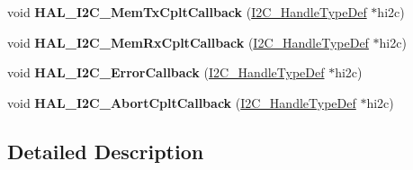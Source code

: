 \begin{DoxyCompactItemize}
\mbox{\label{group___i2_c___exported___functions___group2_ga874f6104d2cdbced9f2ab6e941ec58f0}} 
void {\bfseries H\+A\+L\+\_\+\+I2\+C\+\_\+\+Mem\+Tx\+Cplt\+Callback} (\hyperlink{struct_i2_c___handle_type_def}{I2\+C\+\_\+\+Handle\+Type\+Def} $\ast$hi2c)
\item 
\mbox{\label{group___i2_c___exported___functions___group2_gac16a95413b35f05c5ce725fefd8531a5}} 
void {\bfseries H\+A\+L\+\_\+\+I2\+C\+\_\+\+Mem\+Rx\+Cplt\+Callback} (\hyperlink{struct_i2_c___handle_type_def}{I2\+C\+\_\+\+Handle\+Type\+Def} $\ast$hi2c)
\item 
\mbox{\label{group___i2_c___exported___functions___group2_ga4d5338cd64a656dfdc4154773bc4f05d}} 
void {\bfseries H\+A\+L\+\_\+\+I2\+C\+\_\+\+Error\+Callback} (\hyperlink{struct_i2_c___handle_type_def}{I2\+C\+\_\+\+Handle\+Type\+Def} $\ast$hi2c)
\item 
\mbox{\label{group___i2_c___exported___functions___group2_gaa4c2f59ea15698a1490401e5bbc3f296}} 
void {\bfseries H\+A\+L\+\_\+\+I2\+C\+\_\+\+Abort\+Cplt\+Callback} (\hyperlink{struct_i2_c___handle_type_def}{I2\+C\+\_\+\+Handle\+Type\+Def} $\ast$hi2c)
\end{DoxyCompactItemize}


\subsection{Detailed Description}
